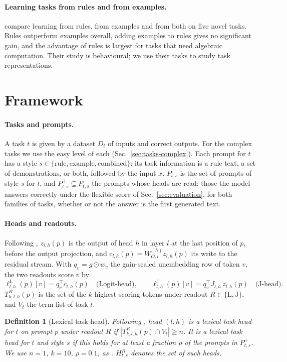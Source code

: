 \documentclass[11pt,a4paper]{article}
\newtheorem{definition}{Definition}
\begin{document}
\paragraph{Learning tasks from rules and from examples.} \citet{fu2026rules} compare learning from rules, from examples and from both on five novel tasks. Rules outperform examples overall, adding examples to rules gives no significant gain, and the advantage of rules is largest for tasks that need algebraic computation. Their study is behavioural; we use their tasks to study task representations.

\section{Framework}\label{sec:framework}
\paragraph{Tasks and prompts.} A task $t$ is given by a dataset $D_t$ of inputs and correct outputs. For the complex tasks we use the easy level of each (Sec.~\ref{sec:tasks-complex}). Each prompt for $t$ has a style $s\in\{\text{rule},\text{example},\text{combined}\}$: its task information is a rule text, a set of demonstrations, or both, followed by the input $x$. $P_{t,s}$ is the set of prompts of style $s$ for $t$, and $P^{+}_{t,s}\subseteq P_{t,s}$ the prompts whose heads are read: those the model answers correctly under the flexible score of Sec.~\ref{sec:evaluation}, for both families of tasks, whether or not the answer is the first generated text.

\paragraph{Heads and readouts.} Following \citet[Sec.~2]{merlo2026headjlens}, $z_{l,h}(p)$ is the output of head $h$ in layer $l$ at the last position of $p$, before the output projection, and $c_{l,h}(p)=W^{(h)}_{O,l}z_{l,h}(p)$ its write to the residual stream. With $q_v=g\odot w_v$ the gain-scaled unembedding row of token $v$, the two readouts score $v$ by
\[
\ell^{\mathrm{L}}_{l,h}(p)[v]=q_v^\top c_{l,h}(p)\quad\text{(Logit-head)},\qquad
\ell^{\mathrm{J}}_{l,h}(p)[v]=q_v^\top J_{l,h}\,z_{l,h}(p)\quad\text{(J-head)}.
\]
$T^{R}_{k,l,h}(p)$ is the set of the $k$ highest-scoring tokens under readout $R\in\{\mathrm{L},\mathrm{J}\}$, and $V_t$ the term list of task $t$.

\begin{definition}[Lexical task head]\label{def:lth}
Following \citet[Sec.~2.2.2]{yang2026shared}, head $(l,h)$ is a lexical task head for $t$ on prompt $p$ under readout $R$ if $|T^{R}_{k,l,h}(p)\cap V_t|\geq n$. It is a lexical task head for $t$ and style $s$ if this holds for at least a fraction $\rho$ of the prompts in $P^{+}_{t,s}$. We use $n=1$, $k=10$, $\rho=0.1$, as \citet{yang2026shared}. $H^{R}_{t,s}$ denotes the set of such heads.
\end{definition}
\end{document}
